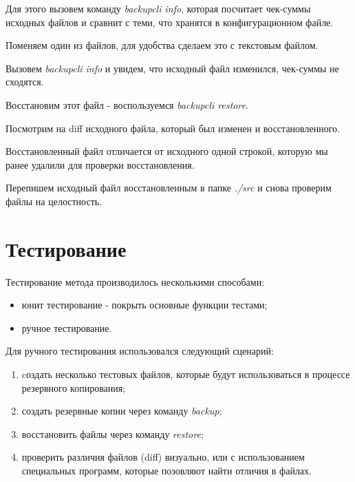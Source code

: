 Для этого вызовем команду \textit{backupcli info}, которая посчитает чек-суммы исходных файлов и сравнит с теми, что хранятся в конфигурационном файле.  


Поменяем один из файлов, для удобства сделаем это с текстовым файлом. 


\newpage
Вызовем \textit{backupcli info} и увидем, что исходный файл изменился, чек-суммы не сходятся.  


Восстановим этот файл - воспользуемся \textit{backupcli restore}.


Посмотрим на diff исходного файла, который был изменен и восстановленного. 

Восстановленный файл отличается от исходного одной строкой, которую мы ранее удалили для проверки восстановления.  

\newpage
Перепишем исходный файл восстановленным в папке \textit{./src} и снова проверим файлы на целостность.



\section{Тестирование}

\begin{flushleft}
Тестирование метода производилось несколькими способами:
\end{flushleft}

\begin{itemize}[label=\textbullet]
\item юнит тестирование - покрыть основные функции тестами;
\item ручное тестирование.
\end{itemize}

\begin{flushleft}
Для ручного тестирования использовался следующий сценарий:
\end{flushleft}
\begin{enumerate}
\item  cоздать несколько тестовых файлов, которые будут использоваться в процессе резервного копирования;
\item создать резервные копии через команду \textit{backup};
\item восстановить файлы через команду \textit{restore};
\item проверить различия файлов (diff) визуально, или с использованием специальных программ, которые позовляют найти отличия в файлах.
\end{enumerate}


